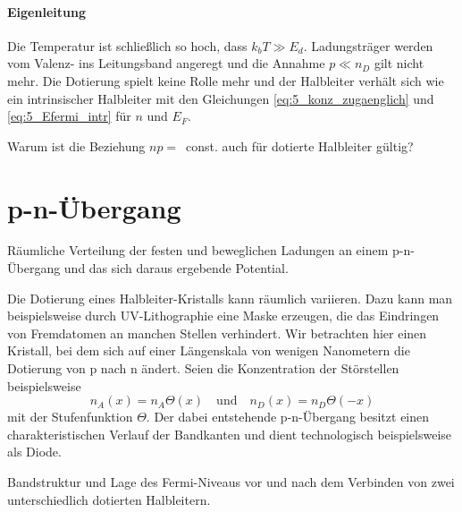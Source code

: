 \paragraph*{Eigenleitung} Die Temperatur ist schließlich so hoch, dass $k_b T \gg E_d$. Ladungsträger werden vom Valenz- ins Leitungsband angeregt und die Annahme $p \ll n_D$ gilt nicht mehr. Die Dotierung spielt keine Rolle mehr und der Halbleiter verhält sich wie ein intrinsischer Halbleiter mit den Gleichungen  \ref{eq:5_konz_zugaenglich} und  \ref{eq:5_Efermi_intr} für $n$ und $E_F$.


\begin{questions}
    \item Warum ist die Beziehung $n p = $~const. auch für dotierte Halbleiter gültig? 
\end{questions}

    


\section{p-n-Übergang}

\begin{marginfigure}
    \caption{Räumliche Verteilung der festen und beweglichen Ladungen an einem p-n-Übergang und das sich daraus ergebende Potential.}
\end{marginfigure}

Die Dotierung eines Halbleiter-Kristalls kann räumlich variieren. Dazu kann man beispielsweise durch UV-Lithographie eine Maske erzeugen, die das Eindringen von Fremdatomen an manchen Stellen verhindert. Wir betrachten hier einen Kristall, bei dem sich auf einer Längenskala von wenigen Nanometern die Dotierung von p nach n ändert.  Seien die Konzentration der Störstellen beispielsweise
\begin{equation}
    n_A(x) = n_A \Theta(x) \quad \text{und}  \quad  n_D(x) = n_D \Theta(-x) 
\end{equation}
mit der Stufenfunktion $\Theta$. Der dabei entstehende p-n-Übergang besitzt einen charakteristischen Verlauf der Bandkanten und dient technologisch beispielsweise als Diode.




\begin{marginfigure}[-10mm]
    \caption{Bandstruktur und Lage des Fermi-Niveaus vor und nach dem Verbinden  von zwei unterschiedlich dotierten Halbleitern.}
\end{marginfigure}

